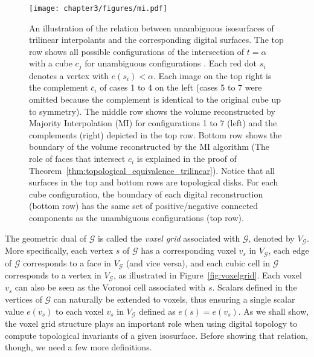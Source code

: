 \begin{figure}[t]
\begin{center}
\texttt{[image: chapter3/figures/mi.pdf]}
\caption{An illustration of the relation between unambiguous
  isosurfaces of trilinear interpolants and the corresponding digital
  surfaces.  The top row shows all possible configurations of the
  intersection of $t = \alpha$ with a cube $c_j$ for unambiguous
  configurations \cite{lopes:tvcg:2003}.  Each red dot $s_i$ denotes a
  vertex with $e(s_i) < \alpha$. Each image on the top right is the
  complement $\bar{c}_i$ of cases 1 to 4 on the left (cases 5 to 7
  were omitted because the complement is identical to the original
  cube up to symmetry).  The middle row shows the volume reconstructed
  by Majority Interpolation (MI) for configurations 1 to 7 (left) and
  the complements (right) depicted in the top row.  Bottom row shows
  the boundary of the volume reconstructed by the MI algorithm (The
  role of faces that intersect $c_i$ is explained in the proof of
  Theorem~\ref{thm:topological_equivalence_trilinear}).  Notice that
  all surfaces in the top and bottom rows are topological disks. For
  each cube configuration, the boundary of each digital reconstruction
  (bottom row) has the same set of positive/negative connected components as the
  unambiguous configurations (top row).  }
\label{fig:topology_preserving}
\end{center}
\end{figure}

The geometric dual of $\mathcal{G}$ is called the \emph{voxel grid}
associated with $\mathcal{G}$, denoted by $V_{\mathcal{G}}$. More
specifically, each vertex $s$ of $\mathcal{G}$ has a corresponding
voxel $v_s$ in $V_{\mathcal{G}}$, each edge of $\mathcal{G}$
corresponds to a face in $V_{\mathcal{G}}$ (and vice versa), and each
cubic cell in $\mathcal{G}$ corresponds to a vertex in
$V_{\mathcal{G}}$, as illustrated in Figure~\ref{fig:voxelgrid}.  Each
voxel $v_s$ can also be seen as the Voronoi cell associated with $s$.
Scalars defined in the vertices of $\mathcal{G}$ can naturally be
extended to voxels, thus ensuring a single scalar value $e(v_s)$ to
each voxel $v_s$ in $V_{\mathcal{G}}$ defined as $e(s)=e(v_s)$.  As we
shall show, the voxel grid structure plays an
important role when using digital topology to compute topological
invariants of a given isosurface. Before showing that relation,
though, we need a few more definitions.


